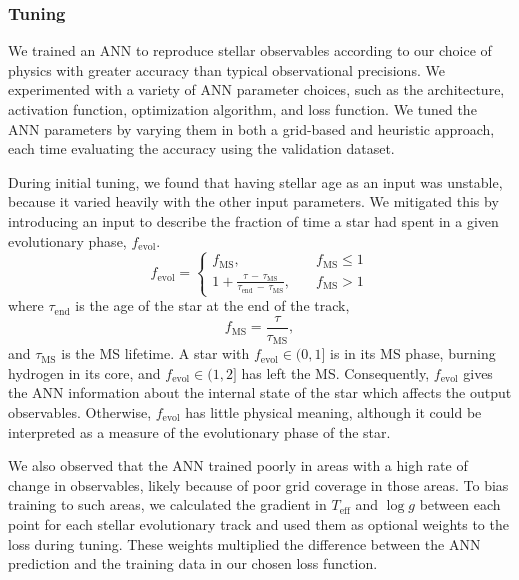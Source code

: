 \documentclass[fleqn,usenatbib]{mnras}
\newcommand{\teff}{\ensuremath{T_\mathrm{eff}}}
\begin{document}
\subsubsection{Tuning}\label{sec:opt}



We trained an ANN to reproduce stellar observables according to our choice of physics with greater accuracy than typical observational precisions. We experimented with a variety of ANN parameter choices, such as the architecture, activation function, optimization algorithm, and loss function. We tuned the ANN parameters by varying them in both a grid-based and heuristic approach, each time evaluating the accuracy using the validation dataset.

During initial tuning, we found that having stellar age as an input was unstable, because it varied heavily with the other input parameters. We mitigated this by introducing an input to describe the fraction of time a star had spent in a given evolutionary phase, $f_\mathrm{evol}$. 
%
\begin{equation}
    f_\mathrm{evol} = \begin{cases}
        f_\mathrm{MS},\quad &f_\mathrm{MS} \leq 1\\
        1 + \frac{\tau\,-\,\tau_\mathrm{MS}}{\tau_\mathrm{end}\,-\,\tau_\mathrm{MS}},\quad &f_\mathrm{MS} > 1
    \end{cases}
\end{equation}
%
where $\tau_\mathrm{end}$ is the age of the star at the end of the track,
%
\begin{equation}
    f_\mathrm{MS} = \frac{\tau}{\tau_\mathrm{MS}},
\end{equation}
%
and $\tau_\mathrm{MS}$ is the MS lifetime. A star with $f_\mathrm{evol} \in (0, 1]$ is in its MS phase, burning hydrogen in its core, and $f_\mathrm{evol} \in (1, 2]$ has left the MS. Consequently, $f_\mathrm{evol}$ gives the ANN information about the internal state of the star which affects the output observables. Otherwise, $f_\mathrm{evol}$ has little physical meaning, although it could be interpreted as a measure of the evolutionary phase of the star.

We also observed that the ANN trained poorly in areas with a high rate of change in observables, likely because of poor grid coverage in those areas. To bias training to such areas, we calculated the gradient in $\teff$ and $\log g$ between each point for each stellar evolutionary track and used them as optional weights to the loss during tuning. These weights multiplied the difference between the ANN prediction and the training data in our chosen loss function.
\end{document}
